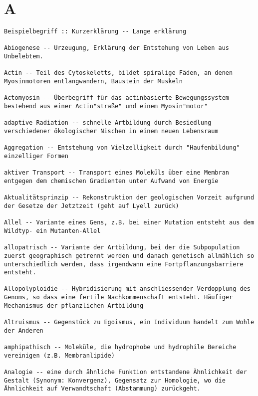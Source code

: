 \documentclass{article}
\begin{document}
\vspace{-1mm}

\section{A}
\begin{verbatim}
Beispielbegriff :: Kurzerklärung -- Lange erklärung 

Abiogenese -- Urzeugung, Erklärung der Entstehung von Leben aus Unbelebtem.

Actin -- Teil des Cytoskeletts, bildet spiralige Fäden, an denen Myosinmotoren entlangwandern, Baustein der Muskeln

Actomyosin -- Überbegriff für das actinbasierte Bewegungssystem bestehend aus einer Actin"straße" und einem Myosin"motor"

adaptive Radiation -- schnelle Artbildung durch Besiedlung verschiedener ökologischer Nischen in einem neuen Lebensraum

Aggregation -- Entstehung von Vielzelligkeit durch "Haufenbildung" einzelliger Formen

aktiver Transport -- Transport eines Moleküls über eine Membran entgegen dem chemischen Gradienten unter Aufwand von Energie

Aktualitätsprinzip -- Rekonstruktion der geologischen Vorzeit aufgrund der Gesetze der Jetztzeit (geht auf Lyell zurück)

Allel -- Variante eines Gens, z.B. bei einer Mutation entsteht aus dem Wildtyp- ein Mutanten-Allel

allopatrisch -- Variante der Artbildung, bei der die Subpopulation zuerst geographisch getrennt werden und danach genetisch allmählich so unterschiedlich werden, dass irgendwann eine Fortpflanzungsbarriere entsteht.

Allopolyploidie -- Hybridisierung mit anschliessender Verdopplung des Genoms, so dass eine fertile Nachkommenschaft entsteht. Häufiger Mechanismus der pflanzlichen Artbildung

Altruismus -- Gegenstück zu Egoismus, ein Individuum handelt zum Wohle der Anderen

amphipathisch -- Moleküle, die hydrophobe und hydrophile Bereiche vereinigen (z.B. Membranlipide)

Analogie -- eine durch ähnliche Funktion entstandene Ähnlichkeit der Gestalt (Synonym: Konvergenz), Gegensatz zur Homologie, wo die Ähnlichkeit auf Verwandtschaft (Abstammung) zurückgeht.


\end{verbatim}
\end{document}
